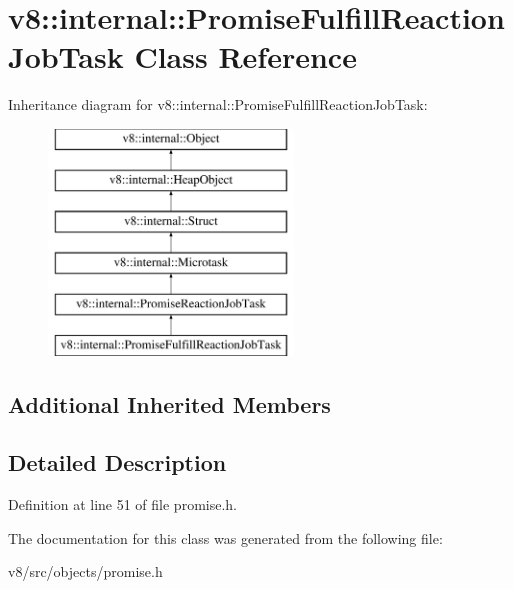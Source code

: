\hypertarget{classv8_1_1internal_1_1PromiseFulfillReactionJobTask}{}\section{v8\+:\+:internal\+:\+:Promise\+Fulfill\+Reaction\+Job\+Task Class Reference}
\label{classv8_1_1internal_1_1PromiseFulfillReactionJobTask}
Inheritance diagram for v8\+:\+:internal\+:\+:Promise\+Fulfill\+Reaction\+Job\+Task\+:\begin{figure}[H]
\begin{center}
\leavevmode
\includegraphics[height=6.000000cm]{classv8_1_1internal_1_1PromiseFulfillReactionJobTask}
\end{center}
\end{figure}
\subsection*{Additional Inherited Members}


\subsection{Detailed Description}


Definition at line 51 of file promise.\+h.



The documentation for this class was generated from the following file\+:\begin{DoxyCompactItemize}
\item 
v8/src/objects/promise.\+h\end{DoxyCompactItemize}
